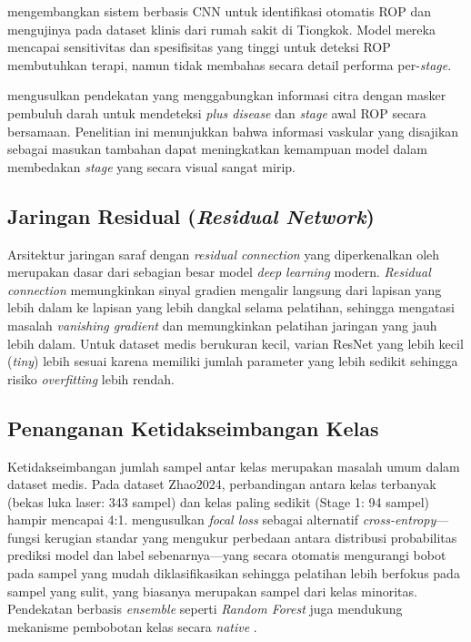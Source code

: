 \citet{Tong2020} mengembangkan sistem berbasis CNN untuk identifikasi otomatis ROP dan mengujinya
pada dataset klinis dari rumah sakit di Tiongkok. Model mereka mencapai sensitivitas dan
spesifisitas yang tinggi untuk deteksi ROP membutuhkan terapi, namun tidak membahas secara
detail performa per-\textit{stage}.

\citet{Vahidmoghadam2026} mengusulkan pendekatan yang menggabungkan informasi citra dengan
masker pembuluh darah untuk mendeteksi \textit{plus disease} dan \textit{stage} awal ROP secara
bersamaan. Penelitian ini menunjukkan bahwa informasi vaskular yang disajikan sebagai masukan
tambahan dapat meningkatkan kemampuan model dalam membedakan \textit{stage} yang secara visual
sangat mirip.

\subsection{Jaringan Residual (\textit{Residual Network})}

Arsitektur jaringan saraf dengan \textit{residual connection} yang diperkenalkan oleh
\citet{He2016} merupakan dasar dari sebagian besar model \textit{deep learning} modern.
\textit{Residual connection} memungkinkan sinyal gradien mengalir langsung dari lapisan yang
lebih dalam ke lapisan yang lebih dangkal selama pelatihan, sehingga mengatasi masalah
\textit{vanishing gradient} dan memungkinkan pelatihan jaringan yang jauh lebih dalam. Untuk
dataset medis berukuran kecil, varian ResNet yang lebih kecil (\textit{tiny}) lebih sesuai
karena memiliki jumlah parameter yang lebih sedikit sehingga risiko \textit{overfitting} lebih
rendah.

\subsection{Penanganan Ketidakseimbangan Kelas}

Ketidakseimbangan jumlah sampel antar kelas merupakan masalah umum dalam dataset medis.
Pada dataset Zhao2024, perbandingan antara kelas terbanyak (bekas luka laser: 343 sampel) dan
kelas paling sedikit (Stage 1: 94 sampel) hampir mencapai 4:1. \citet{Lin2017} mengusulkan
\textit{focal loss} sebagai alternatif \textit{cross-entropy}---fungsi kerugian standar yang mengukur perbedaan antara distribusi probabilitas prediksi model dan label sebenarnya---yang secara otomatis mengurangi bobot pada sampel yang mudah diklasifikasikan sehingga pelatihan lebih berfokus pada sampel yang sulit, yang biasanya merupakan sampel dari kelas minoritas. Pendekatan berbasis
\textit{ensemble} seperti \textit{Random Forest} juga mendukung mekanisme pembobotan kelas secara
\textit{native} \citep{Breiman2001}.

